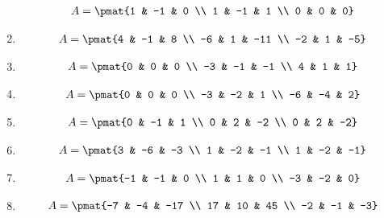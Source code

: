 \begin{enumerate}
\begin{align*}
A = \pmat{1 & -1 & 0 \\ 1 & -1 & 1 \\ 0 & 0 & 0}
\end{align*}

\item

\begin{align*}
A = \pmat{4 & -1 & 8 \\ -6 & 1 & -11 \\ -2 & 1 & -5}
\end{align*}

\item

\begin{align*}
A = \pmat{0 & 0 & 0 \\ -3 & -1 & -1 \\ 4 & 1 & 1}
\end{align*}

\item

\begin{align*}
A = \pmat{0 & 0 & 0 \\ -3 & -2 & 1 \\ -6 & -4 & 2}
\end{align*}

\item

\begin{align*}
A = \pmat{0 & -1 & 1 \\ 0 & 2 & -2 \\ 0 & 2 & -2}
\end{align*}

\item

\begin{align*}
A = \pmat{3 & -6 & -3 \\ 1 & -2 & -1 \\ 1 & -2 & -1}
\end{align*}

\item

\begin{align*}
A = \pmat{-1 & -1 & 0 \\ 1 & 1 & 0 \\ -3 & -2 & 0}
\end{align*}

\item

\begin{align*}
A = \pmat{-7 & -4 & -17 \\ 17 & 10 & 45 \\ -2 & -1 & -3}
\end{align*}


\end{enumerate}
